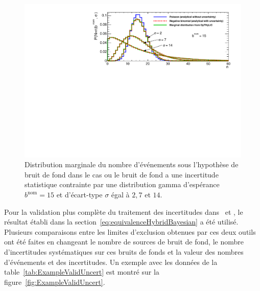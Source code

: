\begin{figure}[!htb]
\begin{center}
\includegraphics[scale=0.7]{figures/SingleChannelStatUncertNegativeBinomial.pdf}
\caption{Distribution marginale du nombre d'\'ev\'enements sous l'hypoth\`ese de bruit de fond dans le cas ou le bruit de fond a une incertitude statistique contrainte par une distribution gamma d'esp\'erance $b^{\text{nom}}=15$ et d'\'ecart-type $\sigma$ \'egal \`a $2, 7$ et $14$.\label{fig:SingleChannelStatUncertNegativeBinomial}}
\end{center}
\end{figure}

Pour la validation plus compl\`ete du traitement des incertitudes dans \opthylic~et \tifosi, le r\'esultat \'etabli dans la section~\ref{eq:equivalenceHybridBayesian} a \'et\'e utilis\'e. Plusieurs comparaisons entre les limites d'exclusion obtenues par ces deux outils
ont \'et\'e faites en changeant le nombre de sources de bruit de fond, le nombre d'incertitudes syst\'ematiques sur ces bruits de fonds et la valeur des nombres d'\'ev\'enements et des incertitudes. Un exemple avec les donn\'ees de la table~\ref{tab:ExampleValidUncert} est montr\'e sur la figure~\ref{fig:ExampleValidUncert}. 


